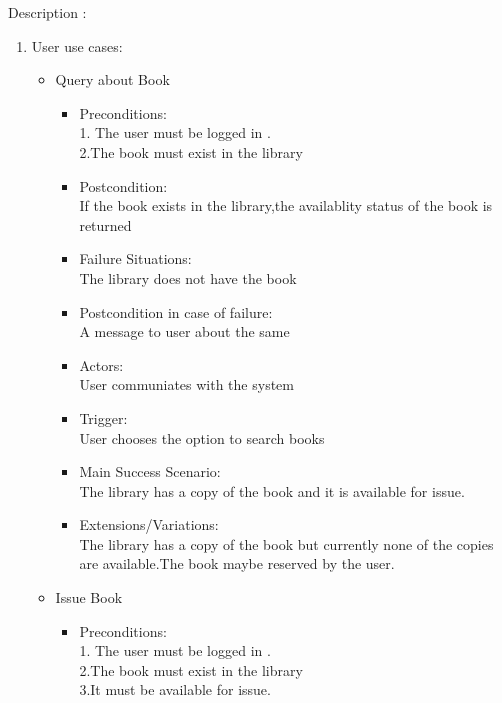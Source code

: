 \documentclass[a4paper]{article}
\begin{document}
Description :
\\
\begin{enumerate}
\item User use cases:
	\begin{itemize}
	
	\item Query about Book\\
	\begin{itemize}
	\item Preconditions:\\
	1. The user must be logged in .\\
	2.The book must exist in the library\\
\item  Postcondition: \\If the book exists in the library,the availablity status of the book is returned\\
 \item Failure Situations:\\ The library does not have  the book \\
 \item Postcondition in case of failure:\\A message to user about the same\\
\item  Actors:\\ User communiates with the system\\
\item  Trigger:\\ User chooses the option to search books\\
 \item Main Success Scenario: \\The library has a copy of the book and it is available for issue.\\
\item  Extensions/Variations: \\The library has a copy of the book but currently none of the copies are available.The book maybe reserved by the user.
	\end{itemize}
 \item Issue Book\\
	\begin{itemize}
	 \item Preconditions:\\
	 1. The user must be logged in .\\
	 2.The book must exist in the library \\
	 3.It must be available for issue.\\

\end{itemize}
\end{itemize}
\end{enumerate}
\end{document}
